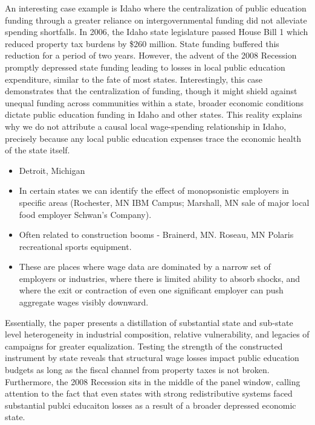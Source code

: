 \documentclass[
  10pt,
]{article}
\begin{document}
An interesting case example is Idaho where the centralization of public
education funding through a greater reliance on intergovernmental
funding did not alleviate spending shortfalls. In 2006, the Idaho state
legislature passed House Bill 1 which reduced property tax burdens by
\$260 million. State funding buffered this reduction for a period of two
years. However, the advent of the 2008 Recession promptly depressed
state funding leading to losses in local public education expenditure,
similar to the fate of most states. Interestingly, this case
demonstrates that the centralization of funding, though it might shield
against unequal funding across communities within a state, broader
economic conditions dictate public education funding in Idaho and other
states. This reality explains why we do not attribute a causal local
wage-spending relationship in Idaho, precisely because any local public
education expenses trace the economic health of the state itself.

\begin{itemize}
\item
  Detroit, Michigan
\item
  In certain states we can identify the effect of monopsonistic
  employers in specific areas (Rochester, MN IBM Campus; Marshall, MN
  sale of major local food employer Schwan's Company).
\item
  Often related to construction booms - Brainerd, MN. Roseau, MN Polaris
  recreational sports equipment.
\item
  These are places where wage data are dominated by a narrow set of
  employers or industries, where there is limited ability to absorb
  shocks, and where the exit or contraction of even one significant
  employer can push aggregate wages visibly downward.
\end{itemize}

Essentially, the paper presents a distillation of substantial state and
sub-state level heterogeneity in industrial composition, relative
vulnerability, and legacies of campaigns for greater equalization.
Testing the strength of the constructed instrument by state reveals that
structural wage losses impact public education budgets as long as the
fiscal channel from property taxes is not broken. Furthermore, the 2008
Recession sits in the middle of the panel window, calling attention to
the fact that even states with strong redistributive systems faced
substantial publci educaiton losses as a result of a broader depressed
economic state.
\end{document}
